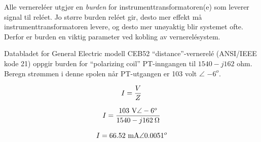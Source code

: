 

Alle vernereléer utgjør en {\it burden} for instrumenttransformatoren(e) som leverer signal til reléet. Jo større burden reléet gir, desto mer effekt må instrumenttransformatoren levere, og desto mer unøyaktig blir systemet ofte. Derfor er burden en viktig parameter ved kobling av vernerelésystem.

\vskip 10pt

Databladet for General Electric modell CEB52 ``distance''-vernerelé (ANSI/IEEE kode 21) oppgir burden for ``polarizing coil'' PT-inngangen til $1540 - j162$ ohm. Beregn strømmen i denne spolen når PT-utgangen er 103 volt $\angle$ $-6^o$.







$$I = {V \over Z}$$

$$I = {103 \hbox{ V} \angle -6^o \over 1540 - j162 \> \Omega}$$

$$I = 66.52 \hbox{ mA} \angle 0.0051^o$$








